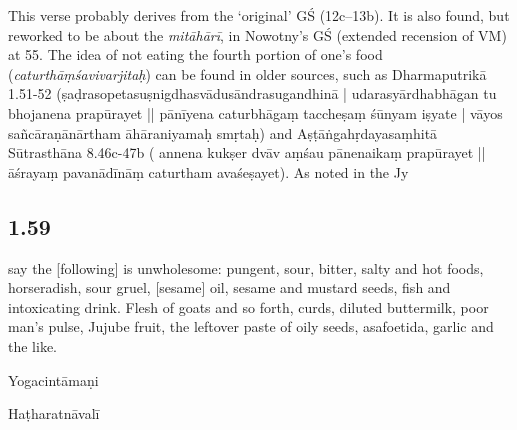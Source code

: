 \begin{ekdosis}
\begin{testimonia}[hp01_058]
\end{testimonia}

\begin{philcomm}[hp01_058]
This verse probably derives from the ‘original’ GŚ (12c–13b). It is also found, but reworked to be about the \emph{mitāhārī}, in Nowotny’s GŚ (extended recension of VM) at 55. The idea of not eating the fourth portion of one’s food (\emph{caturthāṃśavivarjitaḥ}) can be found in older sources, such as Dharmaputrikā 1.51-52 (ṣaḍrasopetasuṣnigdhasvādusāndrasugandhinā |
udarasyārdhabhāgan tu bhojanena prapūrayet || pānīyena caturbhāgaṃ taccheṣaṃ śūnyam iṣyate | vāyos sañcāraṇānārtham āhāraniyamaḥ smṛtaḥ) and Aṣṭāṅgahṛdayasaṃhitā Sūtrasthāna 8.46c-47b ( annena kukṣer dvāv aṃśau pānenaikaṃ prapūrayet ||āśrayaṃ pavanādīnāṃ caturtham avaśeṣayet). As noted in the Jy

\end{philcomm}

\subsection*{1.59}
\begin{translation}[hp01_059]
[Adepts] say the [following] is unwholesome: pungent, sour, bitter, salty and hot foods, horseradish, sour gruel, [sesame] oil, sesame and mustard seeds, fish and intoxicating drink. Flesh of goats and so forth, curds, diluted buttermilk, poor man's pulse, Jujube fruit, the leftover paste of oily seeds, asafoetida, garlic and the like.
\end{translation}

\begin{sources}[hp01_059]
\end{sources}

\begin{testimonia}[hp01_059]
Yogacintāmaṇi

\begin{versinnote}
\end{versinnote}

Haṭharatnāvalī

\begin{versinnote}
\end{versinnote}


\end{testimonia}
\end{ekdosis}

